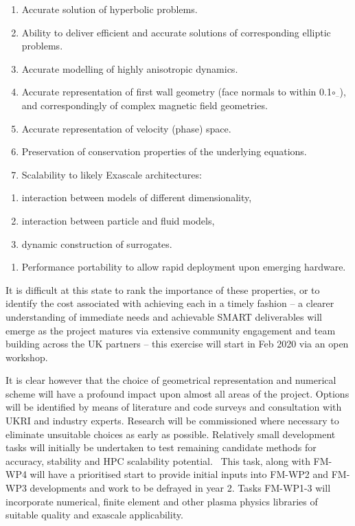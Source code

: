 \documentclass[a4paper]{article}
\newcommand\textsubscript[1]{\ensuremath{{}_{\text{#1}}}}
\newcommand\liststyleWWNumviii{%
\renewcommand\theenumi{\arabic{enumi}}
\renewcommand\theenumii{\arabic{enumii}}
\renewcommand\theenumiii{\arabic{enumiii}}
\renewcommand\theenumiv{\arabic{enumiv}}
\renewcommand\labelenumi{P\theenumi.}
\renewcommand\labelenumii{\theenumii.}
\renewcommand\labelenumiii{\theenumiii.}
\renewcommand\labelenumiv{\theenumiv.}
}
\newcommand\liststyleWWNumxiii{%
\renewcommand\theenumi{\alph{enumi}}
\renewcommand\theenumii{\alph{enumii}}
\renewcommand\theenumiii{\roman{enumiii}}
\renewcommand\theenumiv{\arabic{enumiv}}
\renewcommand\labelenumi{\theenumi.}
\renewcommand\labelenumii{\theenumii.}
\renewcommand\labelenumiii{\theenumiii.}
\renewcommand\labelenumiv{\theenumiv.}
}
\begin{document}
\liststyleWWNumviii
\begin{enumerate}
\item %
Accurate solution of hyperbolic problems.
\item Ability to deliver efficient and accurate solutions of corresponding elliptic problems.
\item Accurate modelling of highly anisotropic dynamics. 
\item Accurate representation of first wall geometry (face normals to within 0.1$\circ$\textsubscript{--}), and
correspondingly of complex magnetic field geometries.
\item Accurate representation of velocity (phase) space.
\item Preservation of conservation properties of the underlying equations.
\item Scalability to likely Exascale architectures:
\end{enumerate}
\liststyleWWNumxiii
\begin{enumerate}
\item interaction between models of different dimensionality,
\item interaction between particle and fluid models,
\item dynamic construction of surrogates.
\end{enumerate}
\liststyleWWNumviii
\begin{enumerate}
\item Performance portability to allow rapid deployment upon emerging hardware.
\end{enumerate}

\bigskip

It is difficult at this state to rank the importance of these properties, or to identify the cost associated with
achieving each in a timely fashion -- a clearer understanding of immediate needs and achievable SMART deliverables will
emerge as the project matures via extensive community engagement and team building across the UK partners -- this
exercise will start in Feb 2020 via an open workshop. 


\bigskip

It is clear however that the choice of geometrical representation and numerical scheme will have a profound impact upon
almost all areas of the project. Options will be identified by means of literature and code surveys and consultation
with UKRI and industry experts. Research will be commissioned where necessary to eliminate unsuitable choices as early
as possible. Relatively small development tasks will initially be undertaken to test remaining candidate methods for
accuracy, stability and HPC scalability potential. \ This task, along with FM-WP4 will have a prioritised start to
provide initial inputs into FM-WP2 and FM-WP3 developments and work to be defrayed in year 2. Tasks FM-WP1-3 will
incorporate numerical, finite element and other plasma physics libraries of suitable quality and exascale
applicability.
\end{document}
